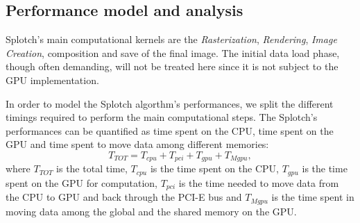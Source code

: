 \documentclass[11pt]{article}
\begin{document}
\subsection{Performance model and analysis}

Splotch's main computational kernels are the {\it Rasterization}, 
{\it Rendering}, {\it Image Creation}, composition and save of 
the final image. The initial data load phase, though often demanding, will not be treated
here since it is not subject to the GPU implementation.

%


In order to model the Splotch algorthm's performances, we split the different timings
required to perform the main computational steps. 
The Splotch's performances can be quantified as time spent on the CPU, time spent on the GPU
and time spent to move data among different memories:
\begin{equation}\label{Ts}
T_{TOT} = T_{cpu} + T_{pci} + T_{gpu} + T_{Mgpu},
\end{equation}
where $T_{TOT}$ is the total time, 
$T_{cpu}$ is the time spent on the CPU, $T_{gpu}$ is the time
spent on the GPU for computation, $T_{pci}$ is the time needed to move data from
the CPU to GPU and back through the PCI-E bus and $T_{Mgpu}$ is the time 
spent in moving data among the global and the shared memory on the GPU.
\end{document}
